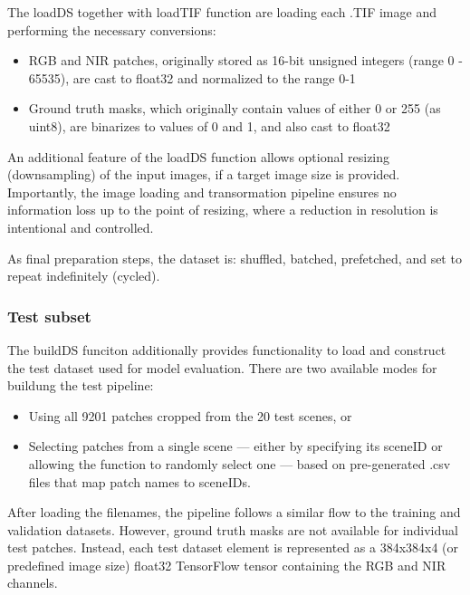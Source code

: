 {The loadDS together with loadTIF function are loading each .TIF image and performing the necessary conversions:

\begin{itemize}
    \item RGB and NIR patches, originally stored as 16-bit unsigned integers (range 0 - 65535), are cast to float32 and normalized to the range 0-1
    \item Ground truth masks, which originally contain values of either 0 or 255 (as uint8), are binarizes to values of 0 and 1, and also cast to float32
\end{itemize}

An additional feature of the loadDS function allows optional resizing (downsampling) of the input images, if a target image size is provided. Importantly, the image loading and transormation pipeline ensures no information loss up to the point of resizing, where a reduction in resolution is intentional and controlled.

As final preparation steps, the dataset is: shuffled, batched, prefetched, and set to repeat indefinitely (cycled).


\subsubsection{Test subset}

The buildDS funciton additionally provides functionality to load and construct the test dataset used for model evaluation. There are two available modes for buildung the test pipeline:

\begin{itemize}
    \item Using all 9201 patches cropped from the 20 test scenes, or
    \item Selecting patches from a single scene --- either by specifying its sceneID or allowing the function to randomly select one --- based on pre-generated .csv files that map patch names to sceneIDs.
\end{itemize}

After loading the filenames, the pipeline follows a similar flow to the training and validation datasets. However, ground truth masks are not available for individual test patches. Instead, each test dataset element is represented as a 384x384x4 (or predefined image size) float32 TensorFlow tensor containing the RGB and NIR channels.

}
